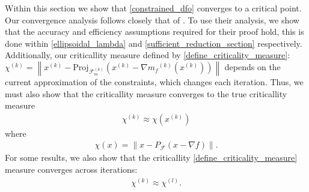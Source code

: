 \documentclass{article}
\theoremstyle{case}
\numberwithin{theorem}{subsection}
\newcommand{\chik}{{\chi^{(k)}}}
\newcommand{\chil}{{\chi^{(l)}}}
\newcommand{\feasiblek}{{\mathcal F_m^{(k)}}}
\newcommand{\feasible}{{\mathcal F}}
\newcommand{\gradf}{\nabla f}
\newcommand{\mfk}{{{m}_f}^{(k)}}
\newcommand{\xk}{x^{(k)}}
\begin{document}
Within this section we show that \cref{constrained_dfo} converges to a critical point.
Our convergence analysis follows closely that of \cite{Conejo:2013:GCT:2620806.2621814}.
To use their analysis, we show that the accuracy and efficiency assumptions required for their proof hold, 
this is done within \cref{ellipsoidal_lambda} and \cref{sufficient_reduction_section} respectively.
Additionally, our criticallity measure defined by \cref{define_criticality_measure}:
$\chik = \left\|\xk - \text{Proj}_{\feasiblek}\left(\xk- \nabla \mfk\left(\xk\right)\right)\right\|$
depends on the current approximation of the constraints, which changes each iteration.
Thus, we must also show that the criticallity measure converges to the true criticallity measure
\begin{align}
\label{verbiage_hoffman_use_one}
\chik \approx \chi (\xk)
\end{align}
where 
\begin{align*}
\chi (x) = \left \| x - P_{\feasible}\left( x - \gradf\right) \right \|.
\end{align*}
For some results, we also show that the criticallity \cref{define_criticality_measure} measure converges across iterations:
\begin{align}
\label{verbiage_hoffman_use_two}
\chik \approx \chil.
\end{align}
\end{document}
